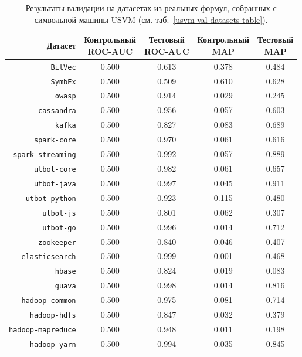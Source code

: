 \begin{table}[ht]
\begin{center}
\begin{tabular}{r|cc|cc}
    Датасет & \makecell{Контрольный \\ \textsc{ROC-AUC}} & \makecell{Тестовый \\ \textsc{ROC-AUC}} & \makecell{Контрольный \\ \textsc{MAP}} & \makecell{Тестовый \\ \textsc{MAP}} \\
    \hline \hline
    \rule{0pt}{2.5ex}
    \texttt{BitVec}           & 0.500 & 0.613 & 0.378 & 0.484 \\
    \texttt{SymbEx}           & 0.500 & 0.509 & 0.610 & 0.628 \\
    \hline
    \texttt{owasp}            & 0.500 & 0.914 & 0.029 & 0.245 \\
    \texttt{cassandra}        & 0.500 & 0.956 & 0.057 & 0.603 \\
    \texttt{kafka}            & 0.500 & 0.827 & 0.083 & 0.689 \\
    \texttt{spark-core}       & 0.500 & 0.970 & 0.061 & 0.616 \\
    \texttt{spark-streaming}  & 0.500 & 0.992 & 0.057 & 0.889 \\
    \texttt{utbot-core}       & 0.500 & 0.982 & 0.061 & 0.657 \\
    \texttt{utbot-java}       & 0.500 & 0.997 & 0.045 & 0.911 \\
    \texttt{utbot-python}     & 0.500 & 0.923 & 0.115 & 0.480 \\
    \texttt{utbot-js}         & 0.500 & 0.801 & 0.062 & 0.307 \\
    \texttt{utbot-go}         & 0.500 & 0.996 & 0.014 & 0.712 \\
    \texttt{zookeeper}        & 0.500 & 0.840 & 0.046 & 0.407 \\
    \texttt{elasticsearch}    & 0.500 & 0.999 & 0.001 & 0.468 \\
    \texttt{hbase}            & 0.500 & 0.824 & 0.019 & 0.083 \\
    \texttt{guava}            & 0.500 & 0.998 & 0.014 & 0.816 \\
    \texttt{hadoop-common}    & 0.500 & 0.975 & 0.081 & 0.714 \\
    \texttt{hadoop-hdfs}      & 0.500 & 0.847 & 0.032 & 0.379 \\
    \texttt{hadoop-mapreduce} & 0.500 & 0.948 & 0.011 & 0.198 \\
    \texttt{hadoop-yarn}      & 0.500 & 0.994 & 0.035 & 0.845 \\
\end{tabular}
\caption{\label{usvm-val-results-roc-auc-avg-prec} Результаты валидации на датасетах из реальных формул, собранных с символьной машины USVM (см. таб.~\ref{usvm-val-datasets-table}).}
\end{center}
\end{table}

